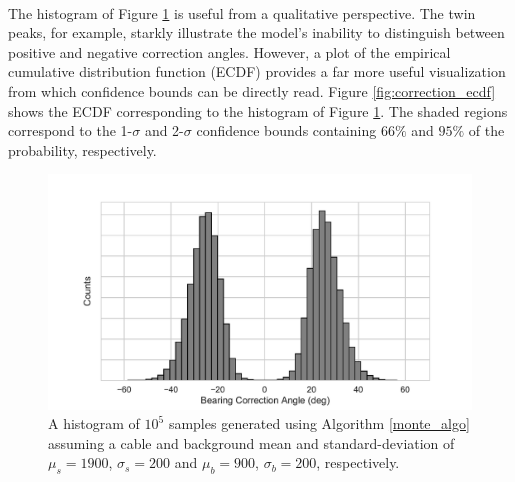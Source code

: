 \documentclass[paper=a4, fontsize=11pt]{scrartcl}
\numberwithin{equation}{section}		%
\numberwithin{figure}{section}			%
\numberwithin{table}{section}				%
\begin{document}
\begin{appendices}
\paragraph{}
The histogram of Figure \ref{fig:correction_hist} is useful from a qualitative perspective. The twin peaks, for example, starkly illustrate the model's inability to distinguish between positive and negative correction angles.  However, a plot of the empirical cumulative distribution function (ECDF) provides a far more useful visualization from which confidence bounds can be directly read. Figure \ref{fig:correction_ecdf} shows the ECDF corresponding to the histogram of Figure \ref{fig:correction_hist}.  The shaded regions correspond to the 1-$\sigma$ and 2-$\sigma$ confidence bounds containing $66\%$ and $95\%$ of the probability, respectively.


\begin{figure}[H]
  \caption{
  A histogram of $10^5$ samples generated using Algorithm \ref{monte_algo} assuming a cable and background mean and standard-deviation of $\mu_s=1900$, $\sigma_s=200$ and  $\mu_b=900$, $\sigma_b=200$, respectively. 
  }

  \label{fig:correction_hist}
  \centering
  \includegraphics[width=1.0\textwidth]{figures/correction_hist.pdf}
\end{figure}



\end{appendices}
\end{document}
